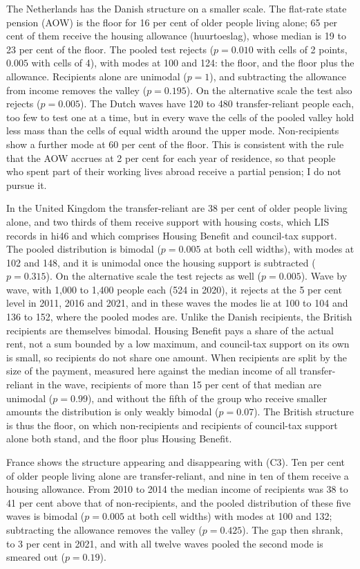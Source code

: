 The Netherlands has the Danish structure on a smaller scale. The flat-rate state pension (AOW) is the floor for 16 per cent of older people living alone; 65 per cent of them receive the housing allowance (huurtoeslag), whose median is 19 to 23 per cent of the floor. The pooled test rejects ($p=0.010$ with cells of 2 points, $0.005$ with cells of 4), with modes at 100 and 124: the floor, and the floor plus the allowance. Recipients alone are unimodal ($p=1$), and subtracting the allowance from income removes the valley ($p=0.195$). On the alternative scale the test also rejects ($p=0.005$). The Dutch waves have 120 to 480 transfer-reliant people each, too few to test one at a time, but in every wave the cells of the pooled valley hold less mass than the cells of equal width around the upper mode. Non-recipients show a further mode at 60 per cent of the floor. This is consistent with the rule that the AOW accrues at 2 per cent for each year of residence, so that people who spent part of their working lives abroad receive a partial pension; I do not pursue it.

In the United Kingdom the transfer-reliant are 38 per cent of older people living alone, and two thirds of them receive support with housing costs, which LIS records in hi46 and which comprises Housing Benefit and council-tax support. The pooled distribution is bimodal ($p=0.005$ at both cell widths), with modes at 102 and 148, and it is unimodal once the housing support is subtracted ($p=0.315$). On the alternative scale the test rejects as well ($p=0.005$). Wave by wave, with 1{,}000 to 1{,}400 people each (524 in 2020), it rejects at the 5 per cent level in 2011, 2016 and 2021, and in these waves the modes lie at 100 to 104 and 136 to 152, where the pooled modes are. Unlike the Danish recipients, the British recipients are themselves bimodal. Housing Benefit pays a share of the actual rent, not a sum bounded by a low maximum, and council-tax support on its own is small, so recipients do not share one amount. When recipients are split by the size of the payment, measured here against the median income of all transfer-reliant in the wave, recipients of more than 15 per cent of that median are unimodal ($p=0.99$), and without the fifth of the group who receive smaller amounts the distribution is only weakly bimodal ($p=0.07$). The British structure is thus the floor, on which non-recipients and recipients of council-tax support alone both stand, and the floor plus Housing Benefit.

France shows the structure appearing and disappearing with (C3). Ten per cent of older people living alone are transfer-reliant, and nine in ten of them receive a housing allowance. From 2010 to 2014 the median income of recipients was 38 to 41 per cent above that of non-recipients, and the pooled distribution of these five waves is bimodal ($p=0.005$ at both cell widths) with modes at 100 and 132; subtracting the allowance removes the valley ($p=0.425$). The gap then shrank, to 3 per cent in 2021, and with all twelve waves pooled the second mode is smeared out ($p=0.19$).

